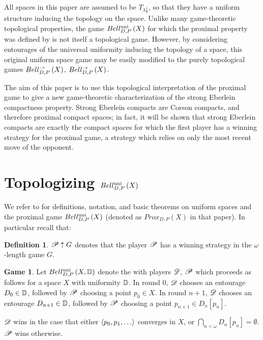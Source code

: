 \documentclass{amsart}
\theoremstyle{definition}
\newtheorem{definition}[theorem]{Definition}
\newtheorem{game}[theorem]{Game}
\begin{document}
  All spaces in this paper are assumed to be \(T_{3\frac{1}{2}}\), so that they
  have a uniform structure inducing the topology on the space.
  Unlike many game-theoretic topological properties, the game \(Bell_{D,P}^{\textrm{uni}}\left({X}\right)\)
  for which the proximal property was defined by is not itself a topological
  game. However, by considering entourages of the universal uniformity
  inducing the topology of a space, this original uniform space game may be
  easily modified to the purely topological games
  \(Bell_{D,P}^{\rightharpoonup}\left({X}\right)\), \(Bell_{D,P}^{\to}\left({X}\right)\).

  The aim of this paper is to use this topological interpretation of the
  proximal game to give a new game-theoretic characterization of the
  strong Eberlein compactness property. Strong Eberlein compacts are Corson
  compacts, and therefore proximal compact spaces; in fact, it will be shown
  that strong Eberlein compacts are exactly the compact spaces for which the
  first player has a  winning strategy for the proximal game,
  a strategy which relies on only the most recent move of the opponent.


\section{Topologizing \(Bell_{D,P}^{\textrm{uni}}\left({X}\right)\)}

  We refer to \cite{MR3227201} for definitions, notation, and basic theorems on
  uniform spaces and the proximal game \(Bell_{D,P}^{\textrm{uni}}\left({X}\right)\) (denoted as
  \(Prox_{D,P}(X)\) in that paper). In particular recall that:

  \begin{definition}
    \(\mathscr{P} \uparrow G\) denotes that the player \(\mathscr{P}\) has a winning strategy
    in the \(\omega\)-length game \(G\).
  \end{definition}

  \begin{game}
    Let \(Bell_{D,P}^{\textrm{uni}}\left({X,\mathbb{D}}\right)\) denote the
     with
    players \(\mathscr{D}\), \(\mathscr{P}\) which proceeds as follows for
    a space \(X\) with uniformity \(\mathbb{D}\). In round \(0\),
    \(\mathscr{D}\) chooses an entourage \(D_0\in\mathbb{D}\), followed by \(\mathscr{P}\)
    choosing a point \(p_0\in X\). In round \(n+1\),
    \(\mathscr{D}\) chooses an entourage
    \(D_{n+1}\in\mathbb{D}\),
    followed by \(\mathscr{P}\) choosing a point \(p_{n+1}\in D_n[p_n]\).

    \(\mathscr{D}\) wins in the case that either
    \(\<p_0,p_1,\dots\>\) converges in \(X\),
    or \(\bigcap_{n<\omega}D_n[p_n] = \emptyset\). \(\mathscr{P}\) wins otherwise.
  \end{game}
\end{document}

